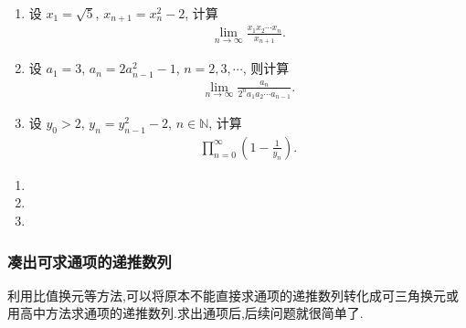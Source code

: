 \documentclass[../../main.tex]{subfiles}
\begin{document}
\begin{example}
\begin{enumerate}
\item 设 $x_1 = \sqrt{5}$, $x_{n+1} = x_n^2 - 2$, 计算
\begin{align*}
\lim_{n \to \infty} \frac{x_1 x_2 \cdots x_n}{x_{n+1}}.
\end{align*}
\item 设 $a_1 = 3$, $a_n = 2a_{n-1}^2 - 1$, $n = 2, 3, \cdots$, 则计算
\begin{align*}
\lim_{n \to \infty} \frac{a_n}{2^n a_1 a_2 \cdots a_{n-1}}.
\end{align*}
\item 设 $y_0 > 2$, $y_n = y_{n-1}^2 - 2$, $n \in \mathbb{N}$, 计算
\begin{align*}
\prod_{n=0}^{\infty} \left(1 - \frac{1}{y_n}\right).
\end{align*}
\end{enumerate}
\end{example}
\begin{solution}
\begin{enumerate}
\item 

\item 

\item 
\end{enumerate}
\end{solution}




\subsubsection{凑出可求通项的递推数列}

利用比值换元等方法,可以将原本不能直接求通项的递推数列转化成可三角换元或用高中方法求通项的递推数列.求出通项后,后续问题就很简单了.
\end{document}
